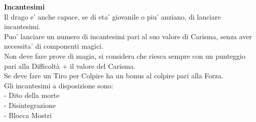 \begin{multicols}{2}
\textbf{Incantesimi}\\
Il drago e' anche capace, se di eta' giovanile o piu' anziano, di lanciare incantesimi.\\
Puo' lanciare un numero di incantesimi pari al suo valore di Carisma, senza aver necessita' di componenti magici.\\
Non deve fare prove di magia, si considera che riesca sempre con un punteggio pari alla Difficoltà + il valore del Carisma.\\
Se deve fare un Tiro per Colpire ha un bonus al colpire pari alla Forza.\\
Gli incantesimi a disposizione sono:\\
- Dito della morte\\
- Disintegrazione\\
- Blocca Mostri\\


\end{multicols}
